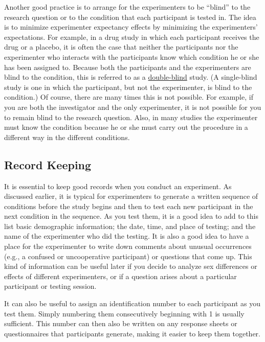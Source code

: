 \documentclass[
]{krantz}
\begin{document}
Another good practice is to arrange for the experimenters to be ``blind'' to the research question or to the condition that each participant is tested in. The idea is to minimize experimenter expectancy effects by minimizing the experimenters' expectations. For example, in a drug study in which each participant receives the drug or a placebo, it is often the case that neither the participants nor the experimenter who interacts with the participants know which condition he or she has been assigned to. Because both the participants and the experimenters are blind to the condition, this is referred to as a \protect\hyperlink{double-blind}{double-blind} study. (A single-blind study is one in which the participant, but not the experimenter, is blind to the condition.) Of course, there are many times this is not possible. For example, if you are both the investigator and the only experimenter, it is not possible for you to remain blind to the research question. Also, in many studies the experimenter must know the condition because he or she must carry out the procedure in a different way in the different conditions.

\hypertarget{record-keeping}{%
\subsection*{Record Keeping}\label{record-keeping}}


It is essential to keep good records when you conduct an experiment. As discussed earlier, it is typical for experimenters to generate a written sequence of conditions before the study begins and then to test each new participant in the next condition in the sequence. As you test them, it is a good idea to add to this list basic demographic information; the date, time, and place of testing; and the name of the experimenter who did the testing. It is also a good idea to have a place for the experimenter to write down comments about unusual occurrences (e.g., a confused or uncooperative participant) or questions that come up. This kind of information can be useful later if you decide to analyze sex differences or effects of different experimenters, or if a question arises about a particular participant or testing session.

It can also be useful to assign an identification number to each participant as you test them. Simply numbering them consecutively beginning with 1 is usually sufficient. This number can then also be written on any response sheets or questionnaires that participants generate, making it easier to keep them together.
\end{document}
